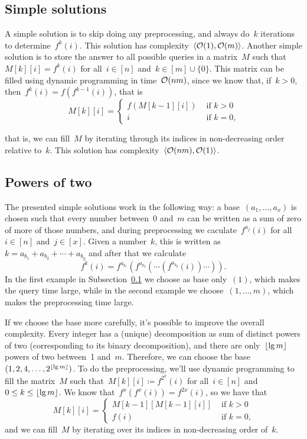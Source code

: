\documentclass[main.tex]{subfiles}
\begin{document}
\subsection{Simple solutions} \label{subsec:anc_sol_simples}

A simple solution is to skip doing any preprocessing, and always do~$k$ iterations to determine~$f^k(i)$. This solution has complexity~$\langle\mathcal{O}(1), \mathcal{O}(m)\rangle$. Another simple solution is to store the answer to all possible queries in a matrix~$M$ such that~$M[k][i] = f^k(i)$ for all~$i \in [n]$ and~$k \in [m] \cup \{0\}$. This matrix can be filled using dynamic programming in time~$\mathcal{O}(nm)$, since we know that, if~$k > 0$, then~$f^k(i) = f(f^{k-1}(i))$, that is
$$M[k][i] = \left\{
	\begin{array}{ll}
		f(M[k - 1][i]) & \text{ if $k > 0$} \\
		i & \text{ if $k = 0$,}
	\end{array}
	\right.
$$

that is, we can fill~$M$ by iterating through its indices in non-decreasing order relative to~$k$. This solution has complexity~$\langle\mathcal{O}(nm), \mathcal{O}(1)\rangle$.

\subsection{Powers of two} \label{subsec:pot2}

The presented simple solutions work in the following way: a base~$(a_1, \ldots, a_x)$ is chosen such that every number between~0 and~$m$ can be written as a sum of zero of more of those numbers, and during preprocessing we caculate~$f^{a_j}(i)$ for all~$i \in [n]$ and~$j \in [x]$. Given a number~$k$, this is written as~${k = a_{b_1} + a_{b_2} + \cdots + a_{b_y}}$ and after that we calculate
$$f^k(i) = f^{a_{b_1}}(f^{a_{b_2}}(\cdots(f^{a_{b_y}}(i))\cdots)).$$
In the first example in Subsection~\ref{subsec:anc_sol_simples} we choose as base only~$(1)$, which makes the query time large, while in the second example we choose~$(1, \ldots, m)$, which makes the preprocessing time large.

If we choose the base more carefully, it's possible to improve the overall complexity. Every integer has a (unique) decomposition as sum of distinct powers of two (corresponding to its binary decomposition), and there are only~$\lfloor\lg m\rfloor$ powers of two between~1 and~$m$. Therefore, we can choose the base~${(1, 2, 4, \ldots, 2^{\lfloor\lg m\rfloor})}$. To do the preprocessing, we'll use dynamic programming to fill the matrix~$M$ such that~$M[k][i] \coloneqq f^{2^k}(i)$ for all~$i \in [n]$ and~$0 \leq k \leq \lfloor\lg m\rfloor$. We know that~$f^x(f^x(i)) = f^{2x}(i)$, so we have that
$$M[k][i] = \left\{
	\begin{array}{ll}
		M[k-1][M[k - 1][i]] & \text{ if $k > 0$} \\
		f(i) & \text{ if $k = 0$,}
	\end{array}
	\right.
$$
and we can fill~$M$ by iterating over its indices in non-decreasing order of~$k$.
\end{document}
